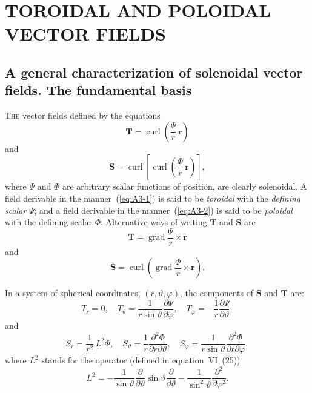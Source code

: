 \chapter{TOROIDAL AND POLOIDAL VECTOR FIELDS}
\label{app:III}

\section{A general characterization of solenoidal vector fields. The fundamental basis}\label{sec:128}

\textsc{The} vector fields defined by the equations
\begin{equation}
\label{eq:A3-1}
\mathbf{T} = \operatorname{curl}\!\left(\frac{\Psi}{r}\,\mathbf{r}\right)
\end{equation}
and
\begin{equation}
\label{eq:A3-2}
\mathbf{S} = \operatorname{curl}\!\left[\operatorname{curl}\!\left(\frac{\Phi}{r}\,\mathbf{r}\right)\right],
\end{equation}
where $\Psi$ and $\Phi$ are arbitrary scalar functions of position, are clearly solenoidal. A field derivable in the manner~(\ref{eq:A3-1}) is said to be \emph{toroidal} with the \emph{defining scalar} $\Psi$; and a field derivable in the manner~(\ref{eq:A3-2}) is said to be \emph{poloidal} with the defining scalar $\Phi$. Alternative ways of writing $\mathbf{T}$ and $\mathbf{S}$ are
\begin{equation}
\label{eq:A3-3}
\mathbf{T} = \operatorname{grad}\frac{\Psi}{r} \times \mathbf{r}
\end{equation}
and
\begin{equation}
\label{eq:A3-4}
\mathbf{S} = \operatorname{curl}\!\left(\operatorname{grad}\frac{\Phi}{r} \times \mathbf{r}\right).
\end{equation}

In a system of spherical coordinates, $(r, \vartheta, \varphi)$, the components of $\mathbf{S}$ and $\mathbf{T}$ are:
\begin{equation}
\label{eq:A3-5}
T_r = 0, \quad T_\vartheta = \frac{1}{r\sin\vartheta}\frac{\partial\Psi}{\partial\varphi}, \quad T_\varphi = -\frac{1}{r}\frac{\partial\Psi}{\partial\vartheta};
\end{equation}
and
\begin{equation}
\label{eq:A3-6}
S_r = \frac{1}{r^2}\,L^2\Phi, \quad S_\vartheta = \frac{1}{r}\frac{\partial^2\Phi}{\partial r\partial\vartheta}, \quad S_\varphi = \frac{1}{r\sin\vartheta}\frac{\partial^2\Phi}{\partial r\partial\varphi},
\end{equation}
where $L^2$ stands for the operator (defined in equation~VI~(25))
\begin{equation}
\label{eq:A3-7}
L^2 = -\frac{1}{\sin\vartheta}\frac{\partial}{\partial\vartheta}\sin\vartheta\frac{\partial}{\partial\vartheta} - \frac{1}{\sin^2\vartheta}\frac{\partial^2}{\partial\varphi^2}.
\end{equation}

